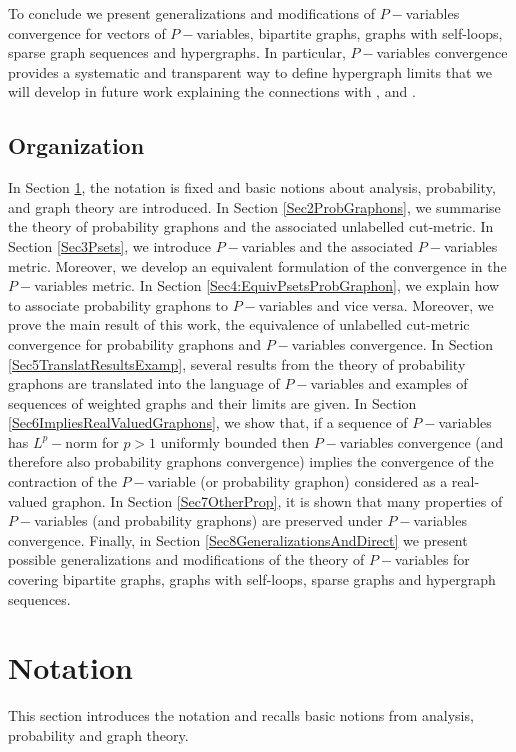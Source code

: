 \documentclass[11pt]{article}
\begin{document}
To conclude we present generalizations and modifications of $P-$variables convergence for vectors of $P-$variables, bipartite graphs, graphs with self-loops, sparse graph sequences and hypergraphs. In particular, $P-$variables convergence provides a systematic and transparent way to define hypergraph limits that we will develop in future work explaining the connections with \cite{HypergraphonsZhao}, \cite{zucal2023action} and \cite{aldous1981representations,aldous2010exchangeability,hoover1979relations,austin2008exchangeable}.

\subsection{Organization}

In Section \ref{Sec1Notation}, the notation is fixed and basic notions about analysis, probability, and graph theory are introduced. In Section \ref{Sec2ProbGraphons}, we summarise the theory of probability graphons and the associated unlabelled cut-metric. In Section \ref{Sec3Psets}, we introduce $P-$variables and the associated $P-$variables metric. Moreover, we develop an equivalent formulation of the convergence in the $P-$variables metric. In Section \ref{Sec4:EquivPsetsProbGraphon}, we explain how to associate probability graphons to $P-$variables and vice versa. Moreover, we prove the main result of this work, the equivalence of unlabelled cut-metric convergence for probability graphons and $P-$variables convergence. In Section \ref{Sec5TranslatResultsExamp}, several results from the theory of probability graphons are translated into the language of $P-$variables and examples of sequences of weighted graphs and their limits are given. In Section \ref{Sec6ImpliesRealValuedGraphons}, we show that, if a sequence of $P-$variables has $L^p-$norm for $p>1$ uniformly bounded then $P-$variables convergence (and therefore also probability graphons convergence) implies the convergence of the contraction of the $P-$variable (or probability graphon) considered as a real-valued graphon. In Section \ref{Sec7OtherProp}, it is shown that many properties of $P-$variables (and probability graphons) are preserved under $P-$variables convergence. Finally, in Section \ref{Sec8GeneralizationsAndDirect} we present possible generalizations and modifications of the theory of $P-$variables for covering bipartite graphs, graphs with self-loops, sparse graphs and hypergraph sequences.


\section{Notation}\label{Sec1Notation}
This section introduces the notation and recalls basic notions from analysis, probability and graph theory.
\end{document}
